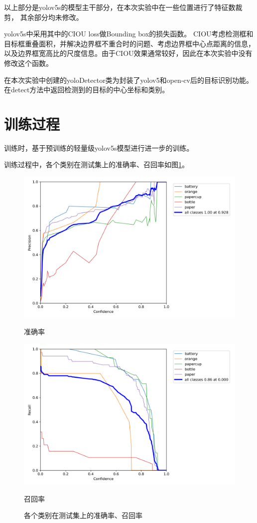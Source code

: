 \documentclass{article}
\begin{document}
以上部分是yolov5s的模型主干部分，在本次实验中在一些位置进行了特征数裁剪，
其余部分均未修改。

yolov5s中采用其中的CIOU loss做Bounding box的损失函数。
CIOU考虑检测框和目标框重叠面积，并解决边界框不重合时的问题、考虑边界框中心点距离的信息，
以及边界框宽高比的尺度信息。由于CIOU效果通常较好，因此在本次实验中没有修改这个函数。

在本次实验中创建的yoloDetector类为封装了yolov5和open-cv后的目标识别功能。
在detect方法中返回检测到的目标的中心坐标和类别。


\section{训练过程}

训练时，基于预训练的轻量级yolov5s模型进行进一步的训练。

训练过程中，各个类别在测试集上的准确率、召回率如图\ref{PandR}。

\begin{figure}[H]
    \begin{minipage}[H]{0.5\linewidth}
        \centering
        \includegraphics[width=\textwidth]{figures/P_curve.png}
        \caption{准确率}
    \end{minipage}
    \begin{minipage}[H]{0.5\linewidth}
        \centering
        \includegraphics[width=\textwidth]{figures/R_curve.png}
        \caption{召回率}
    \end{minipage}
    \label{PandR}
    \caption{各个类别在测试集上的准确率、召回率}
\end{figure}
\end{document}
